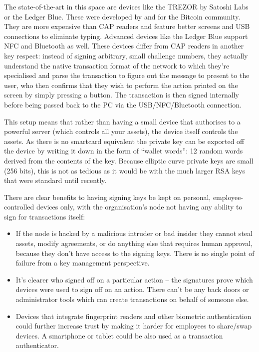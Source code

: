 \documentclass{article}
\begin{document}
The state-of-the-art in this space are devices like the TREZOR\cite{TREZOR} by Satoshi Labs or the Ledger Blue.
These were developed by and for the Bitcoin community. They are more expensive than CAP readers and feature better
screens and USB connections to eliminate typing. Advanced devices like the Ledger Blue support NFC and Bluetooth as
well. These devices differ from CAP readers in another key respect: instead of signing arbitrary, small challenge
numbers, they actually understand the native transaction format of the network to which they're specialised and
parse the transaction to figure out the message to present to the user, who then confirms that they wish to perform
the action printed on the screen by simply pressing a button. The transaction is then signed internally before
being passed back to the PC via the USB/NFC/Bluetooth connection.

This setup means that rather than having a small device that authorises to a powerful server (which controls all
your assets), the device itself controls the assets. As there is no smartcard equivalent the private key can be
exported off the device by writing it down in the form of ``wallet words'': 12 random words derived from the
contents of the key. Because elliptic curve private keys are small (256 bits), this is not as tedious as it would
be with the much larger RSA keys that were standard until recently.

There are clear benefits to having signing keys be kept on personal, employee-controlled devices only, with the
organisation's node not having any ability to sign for transactions itself:

\begin{itemize}
    \item If the node is hacked by a malicious intruder or bad insider they cannot steal assets, modify agreements,
    or do anything else that requires human approval, because they don't have access to the signing keys. There is no single
    point of failure from a key management perspective.
    \item It's clearer who signed off on a particular action -- the signatures prove which devices were used to sign off
    on an action. There can't be any back doors or administrator tools which can create transactions on behalf of someone else.
    \item Devices that integrate fingerprint readers and other biometric authentication could further increase trust by
    making it harder for employees to share/swap devices. A smartphone or tablet could be also used as a transaction authenticator.
\end{itemize}
\end{document}
